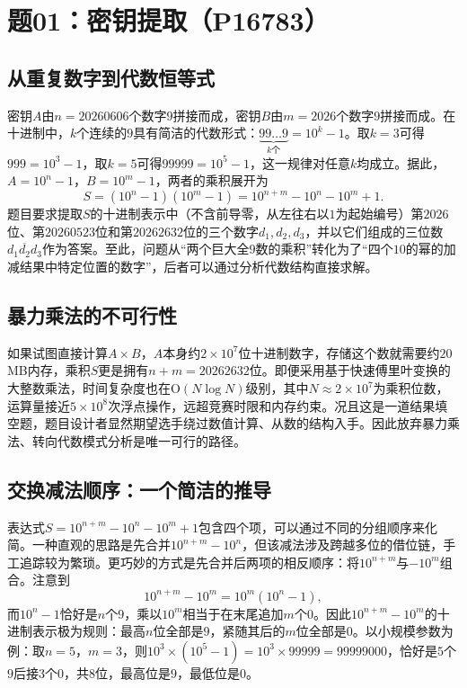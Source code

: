 \section{题01：密钥提取（P16783）}

\subsection{从重复数字到代数恒等式}

密钥$A$由$n = 20260606$个数字$9$拼接而成，密钥$B$由$m = 2026$个数字$9$拼接而成。在十进制中，$k$个连续的$9$具有简洁的代数形式：$\underbrace{99\ldots9}_{k\text{个}} = 10^{k} - 1$。取$k=3$可得$999 = 10^3-1$，取$k=5$可得$99999 = 10^5-1$，这一规律对任意$k$均成立。据此，$A = 10^n - 1$，$B = 10^m - 1$，两者的乘积展开为
\[
S = (10^n - 1)(10^m - 1) = 10^{n+m} - 10^n - 10^m + 1.
\]
题目要求提取$S$的十进制表示中（不含前导零，从左往右以$1$为起始编号）第$2026$位、第$20260523$位和第$20262632$位的三个数字$d_1, d_2, d_3$，并以它们组成的三位数$\overline{d_1 d_2 d_3}$作为答案。至此，问题从“两个巨大全$9$数的乘积”转化为了“四个$10$的幂的加减结果中特定位置的数字”，后者可以通过分析代数结构直接求解。

\subsection{暴力乘法的不可行性}

如果试图直接计算$A \times B$，$A$本身约$2 \times 10^7$位十进制数字，存储这个数就需要约$20$ MB内存，乘积$S$更是拥有$n+m = 20262632$位。即便采用基于快速傅里叶变换的大整数乘法，时间复杂度也在$\mathrm{O}(N \log N)$级别，其中$N \approx 2 \times 10^7$为乘积位数，运算量接近$5 \times 10^8$次浮点操作，远超竞赛时限和内存约束。况且这是一道结果填空题，题目设计者显然期望选手绕过数值计算、从数的结构入手。因此放弃暴力乘法、转向代数模式分析是唯一可行的路径。

\subsection{交换减法顺序：一个简洁的推导}

表达式$S = 10^{n+m} - 10^n - 10^m + 1$包含四个项，可以通过不同的分组顺序来化简。一种直观的思路是先合并$10^{n+m} - 10^n$，但该减法涉及跨越多位的借位链，手工追踪较为繁琐。更巧妙的方式是先合并后两项的相反顺序：将$10^{n+m}$与$-10^m$组合。注意到
\[
10^{n+m} - 10^m = 10^m(10^n - 1),
\]
而$10^n - 1$恰好是$n$个$9$，乘以$10^m$相当于在末尾追加$m$个$0$。因此$10^{n+m} - 10^m$的十进制表示极为规则：最高$n$位全部是$9$，紧随其后的$m$位全部是$0$。以小规模参数为例：取$n = 5$，$m = 3$，则$10^3 \times (10^5 - 1) = 10^3 \times 99999 = 99999000$，恰好是$5$个$9$后接$3$个$0$，共$8$位，最高位是$9$，最低位是$0$。


